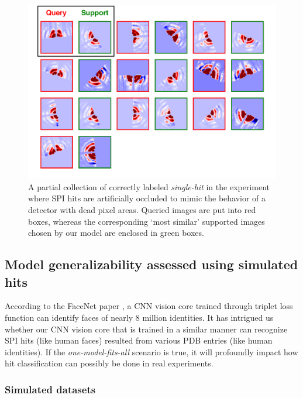 \begin{figure}
\includegraphics[width=\textwidth,keepaspectratio]
{./figures/true_label.single.real.pdf}

\caption{A partial collection of correctly labeled \textit{single-hit} in the
experiment where SPI hits are artificially occluded to mimic the behavior of a
detector with dead pixel areas.  Queried images are put into red boxes, whereas
the corresponding `most similar' supported images chosen by our model are
enclosed in green boxes.}

\label{fig : true single real}
\end{figure}


\subsection{Model generalizability assessed using simulated hits}

According to the FaceNet paper \cite{schroffFaceNetUnifiedEmbedding2015}, a CNN
vision core trained through triplet loss function can identify faces of nearly 8
million identities.  It has intrigued us whether our CNN vision core that is
trained in a similar manner can recognize SPI hits (like human faces) resulted
from various PDB entries (like human identities).  If the
\textit{one-model-fits-all} scenario is true, it will profoundly impact how hit
classification can possibly be done in real experiments.  


\subsubsection{Simulated datasets}

